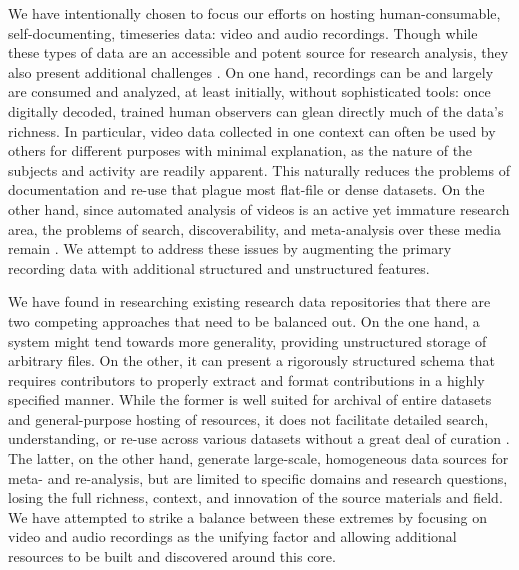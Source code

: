 \documentclass{sig-alternate}
\begin{document}
We have intentionally chosen to focus our efforts on hosting human-consumable, self-documenting, timeseries data: video and audio recordings.
Though while these types of data are an accessible and potent source for research analysis, they also present additional challenges \cite{Lanagan_Smeaton_2012}.
On one hand, recordings can be and largely are consumed and analyzed, at least initially, without sophisticated tools: once digitally decoded, trained human observers can glean directly much of the data's richness.
In particular, video data collected in one context can often be used by others for different purposes with minimal explanation, as the nature of the subjects and activity are readily apparent.
This naturally reduces the problems of documentation and re-use that plague most flat-file or dense datasets.
On the other hand, since automated analysis of videos is an active yet immature research area, the problems of search, discoverability, and meta-analysis over these media remain \cite{Albertson_2013}.
We attempt to address these issues by augmenting the primary recording data with additional structured and unstructured features.


We have found in researching existing research data repositories that there are two competing approaches that need to be balanced out.
On the one hand, a system might tend towards more generality, providing unstructured storage of arbitrary files.
On the other, it can present a rigorously structured schema that requires contributors to properly extract and format contributions in a highly specified manner.
While the former is well suited for archival of entire datasets and general-purpose hosting of resources, it does not facilitate detailed search, understanding, or re-use across various datasets without a great deal of curation \cite{Peer_2012}.
The latter, on the other hand, generate large-scale, homogeneous data sources for meta- and re-analysis, but are limited to specific domains and research questions, losing the full richness, context, and innovation of the source materials and field.
We have attempted to strike a balance between these extremes by focusing on video and audio recordings as the unifying factor and allowing additional resources to be built and discovered around this core.
\end{document}
